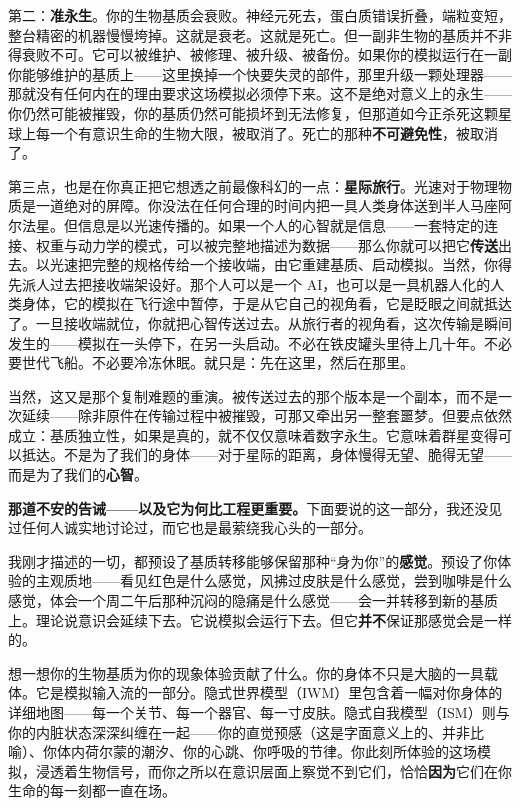 \documentclass[11pt, twoside, openright]{book}
\begin{document}
第二：\textbf{准永生}。你的生物基质会衰败。神经元死去，蛋白质错误折叠，端粒变短，整台精密的机器慢慢垮掉。这就是衰老。这就是死亡。但一副非生物的基质并不非得衰败不可。它可以被维护、被修理、被升级、被备份。如果你的模拟运行在一副你能够维护的基质上------这里换掉一个快要失灵的部件，那里升级一颗处理器------那就没有任何内在的理由要求这场模拟必须停下来。这不是绝对意义上的永生------你仍然可能被摧毁，你的基质仍然可能损坏到无法修复，但那道如今正杀死这颗星球上每一个有意识生命的生物大限，被取消了。死亡的那种\textbf{不可避免性}，被取消了。

第三点，也是在你真正把它想透之前最像科幻的一点：\textbf{星际旅行}。光速对于物理物质是一道绝对的屏障。你没法在任何合理的时间内把一具人类身体送到半人马座阿尔法星。但信息是以光速传播的。如果一个人的心智就是信息------一套特定的连接、权重与动力学的模式，可以被完整地描述为数据------那么你就可以把它\textbf{传送}出去。以光速把完整的规格传给一个接收端，由它重建基质、启动模拟。当然，你得先派人过去把接收端架设好。那个人可以是一个 AI，也可以是一具机器人化的人类身体，它的模拟在飞行途中暂停，于是从它自己的视角看，它是眨眼之间就抵达了。一旦接收端就位，你就把心智传送过去。从旅行者的视角看，这次传输是瞬间发生的------模拟在一头停下，在另一头启动。不必在铁皮罐头里待上几十年。不必要世代飞船。不必要冷冻休眠。就只是：先在这里，然后在那里。

当然，这又是那个复制难题的重演。被传送过去的那个版本是一个副本，而不是一次延续------除非原件在传输过程中被摧毁，可那又牵出另一整套噩梦。但要点依然成立：基质独立性，如果是真的，就不仅仅意味着数字永生。它意味着群星变得可以抵达。不是为了我们的身体------对于星际的距离，身体慢得无望、脆得无望------而是为了我们的\textbf{心智}。

\textbf{那道不安的告诫------以及它为何比工程更重要。}下面要说的这一部分，我还没见过任何人诚实地讨论过，而它也是最萦绕我心头的一部分。

我刚才描述的一切，都预设了基质转移能够保留那种“身为你”的\textbf{感觉}。预设了你体验的主观质地------看见红色是什么感觉，风拂过皮肤是什么感觉，尝到咖啡是什么感觉，体会一个周二午后那种沉闷的隐痛是什么感觉------会一并转移到新的基质上。理论说意识会延续下去。它说模拟会运行下去。但它\textbf{并不}保证那感觉会是一样的。

想一想你的生物基质为你的现象体验贡献了什么。你的身体不只是大脑的一具载体。它是模拟输入流的一部分。隐式世界模型（IWM）里包含着一幅对你身体的详细地图------每一个关节、每一个器官、每一寸皮肤。隐式自我模型（ISM）则与你的内脏状态深深纠缠在一起------你的直觉预感（这是字面意义上的、并非比喻）、你体内荷尔蒙的潮汐、你的心跳、你呼吸的节律。你此刻所体验的这场模拟，浸透着生物信号，而你之所以在意识层面上察觉不到它们，恰恰\textbf{因为}它们在你生命的每一刻都一直在场。
\end{document}
